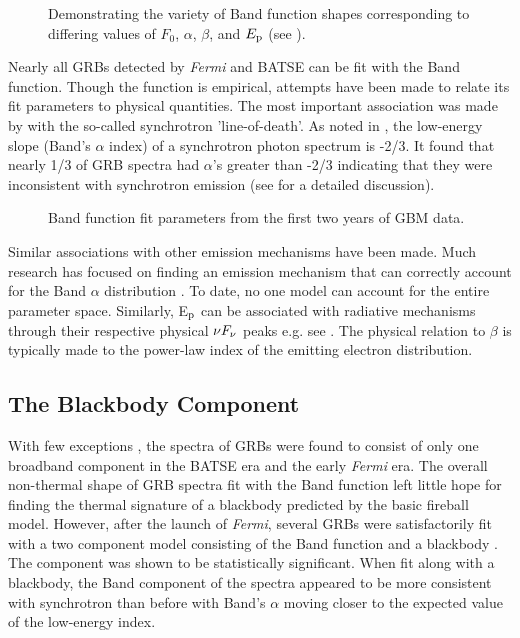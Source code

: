 \begin{figure}[t]
  \centering
  \caption{Demonstrating the variety of Band function shapes
    corresponding to differing values of $F_0$, $\alpha$, $\beta$, and
    $E_{\rm p}$ (see ).}
  \label{fig:bandSpec}
\end{figure}
Nearly all GRBs detected by {\it Fermi} and BATSE can be fit with the
Band function. Though the function is empirical, attempts have been
made to relate its fit parameters to physical quantities. The most
important association was made by \cite{preece:1998} with the
so-called synchrotron 'line-of-death'. As noted
in , the low-energy slope (Band's $\alpha$
index) of a synchrotron photon spectrum is -2/3. It found that nearly
1/3 of GRB spectra had $\alpha$'s greater than -2/3 indicating that
they were inconsistent with synchrotron emission
(see  for a detailed discussion).

\begin{figure}[h]
  \centering 
{}
\caption{Band function fit parameters from the first two
  years of GBM data.}
  \label{fig:catparam}
\end{figure}
Similar associations with other emission mechanisms have been
made. Much research has focused on finding an emission mechanism that
can correctly account for the Band $\alpha$ distribution
\cite{preece:1998,Beloborodov:2010,Daigne:2011,piran:2013}. To date,
no one model can account for the entire parameter space. Similarly,
E$_{\rm p}$ can be associated with radiative mechanisms through their
respective physical $\nu F_{\nu}$ peaks e.g. see
. The physical relation to $\beta$ is
typically made to the power-law index of the emitting electron
distribution.
\subsection{The Blackbody Component}
With few exceptions \cite{gonzalez:2003,abdo+GRB090902B}, the spectra
of GRBs were found to consist of only one broadband component in the
BATSE era and the early {\it Fermi} era. The overall non-thermal shape
of GRB spectra fit with the Band function left little hope for finding
the thermal signature of a blackbody predicted by the basic fireball
model. However, after the launch of {\it Fermi}, several GRBs were
satisfactorily fit with a two component model consisting of the Band
function and a blackbody
\cite{guireic:2010,Axelsson:2012,guiriec:2013}. The component was
shown to be statistically significant. When fit along with a
blackbody, the Band component of the spectra appeared to be more
consistent with synchrotron than before with Band's $\alpha$ moving
closer to the expected value of the low-energy index.

